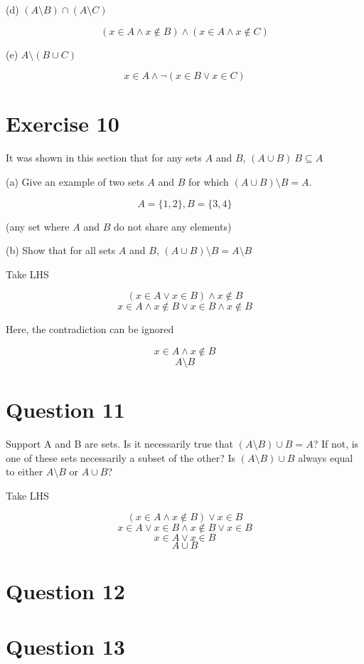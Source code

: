 \documentclass[11pt]{article}
\begin{document}
\noindent (d) $(A \setminus B) \cap (A \setminus C)$

$$(x \in A \wedge x \notin B) \wedge (x \in A \wedge x \notin C)$$

\noindent (e) $A \setminus (B \cup C)$

$$x \in A \wedge \neg (x \in B \vee x \in C)$$

\section*{Exercise 10}

It was shown in this section that for any sets $A$ and $B$, 
$(A \cup B) \ B \subseteq A$

\noindent (a) Give an example of two sets $A$ and $B$ for which 
$(A \cup B) \setminus B = A$.

$$A = \{1, 2\}, B = \{3, 4\}$$

(any set where $A$ and $B$ do not share any elements)

\noindent (b) Show that for all sets $A$ and $B$, 
$(A \cup B) \setminus B = A \setminus B$

Take LHS 

$$(x \in A \vee x \in B) \wedge x \notin B$$
$$x \in A \wedge x \notin B \vee x \in B \wedge x \notin B$$

Here, the contradiction can be ignored

$$x \in A \wedge x \notin B$$
$$A \setminus B$$

\section*{Question 11}

\noindent Support A and B are sets. Is it necessarily true that 
$(A \setminus B) \cup B = A$? If not, is one of these sets necessarily a subset 
of the other? Is $(A \setminus B) \cup B$ always equal to either $A \setminus B$
or $A \cup B$?

Take LHS

$$(x \in A \wedge x \notin B) \vee x \in B$$
$$x \in A \vee x \in B \wedge x \notin B \vee x \in B$$
$$x \in A \vee x \in B$$
$$A \cup B$$

\section*{Question 12}


\section*{Question 13}
\end{document}
